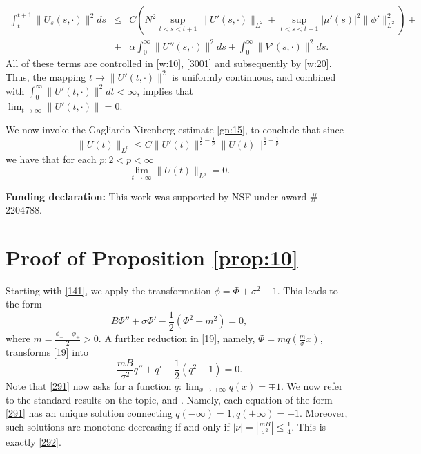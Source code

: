 \documentclass[12pt]{amsart}
\theoremstyle{definition}
\theoremstyle{remark}
\numberwithin{equation}{section}
\renewcommand{\(}{\left(}
\renewcommand{\)}{\right)}
\renewcommand{\[}{\left[}
\renewcommand{\]}{\right]}
\newcommand{\f}[2]{\frac{#1}{#2}}
\newcommand{\al}{\alpha}
\newcommand{\si}{\sigma}
\begin{document}
\begin{eqnarray*}
	\int_t^{t+1} \|U_s(s, \cdot)\|^2 ds &\leq &  C (N^2  \sup_{t<s<t+1} 
	\|U'(s, \cdot)\|_{L^2}+ \sup_{t<s<t+1} |\mu'(s)|^2 \|\phi'\|_{L^2}^2)+ \\
	&+& \al \int_0^\infty \|U''(s, \cdot)\|^2 ds+ \int_0^\infty \|V'(s, \cdot)\|^2 ds.
\end{eqnarray*}
 All of these terms are controlled in \eqref{w:10}, \eqref{3001} and subsequently by \eqref{w:20}. Thus, the mapping $t\to \|U'(t, \cdot)\|^2$ is uniformly continuous, and combined with $\int_0^\infty \|U'(t, \cdot)\|^2 dt<\infty$, implies that \\  $\lim_{t\to \infty} \|U'(t, \cdot)\|=0$. 

We now invoke the Gagliardo-Nirenberg estimate \eqref{gn:15}, to conclude that since 
$$
\|U(t)\|_{L^p}\leq C \|U'(t)\|^{\f{1}{2}-\f{1}{p}} \|U(t)\|^{\f{1}{2}+\f{1}{p}} 
$$
we have that for each $p: 2<p<\infty$
$$
\lim_{t\to \infty} \|U(t)\|_{L^p}=0.
$$


{\bf Funding declaration:} This work was supported by NSF under award \#  2204788. 

 
\appendix

\section{Proof of Proposition \ref{prop:10}}
Starting with \eqref{141}, 
we apply  the transformation $\phi=\Phi+\si^2-1$.  This  leads to the form 
\begin{equation}
	\label{19} 
	B \Phi''+\si \Phi' - \f{1}{2}(\Phi^2-m^2)=0, 
\end{equation}
where $m=\f{\phi_- - \phi_+}{2}>0$. 
A  further reduction in \eqref{19}, namely, $\Phi=m q\left(\f{m}{\si}x\right)$,   transforms \eqref{19} into  
	\begin{equation}
		\label{291} 
		\f{m B}{\si^2} q''+q'-\f{1}{2}\left(q^2-1\right)=0.
	\end{equation}
	Note that \eqref{291} now asks for a function $q: \lim_{x\to \pm \infty} q(x) = \mp 1$. We now refer to the standard results on the topic,  \cite{BS85} and \cite{BRS}. Namely, each equation of the form \eqref{291} has an unique solution connecting $q(-\infty)=1, q(+\infty)=-1$. Moreover, such solutions are monotone decreasing if and only if $|\nu|=|\f{m B}{\si^2}|\leq \f{1}{4}$. 	This is exactly \eqref{292}. 
	
\end{document}
